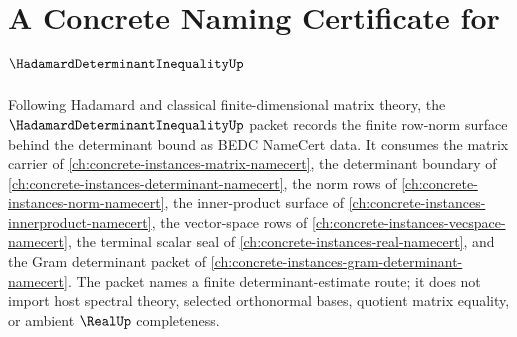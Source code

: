 \chapter{A Concrete Naming Certificate for $\HadamardDeterminantInequalityUp$}
\label{ch:concrete-instances-hadamard-determinant-inequality-namecert}

Following Hadamard and classical finite-dimensional matrix theory, the
$\HadamardDeterminantInequalityUp$ packet records the finite row-norm surface
behind the determinant bound as BEDC NameCert data. It consumes the matrix
carrier of \autoref{ch:concrete-instances-matrix-namecert}, the determinant
boundary of \autoref{ch:concrete-instances-determinant-namecert}, the norm
rows of \autoref{ch:concrete-instances-norm-namecert}, the inner-product
surface of \autoref{ch:concrete-instances-innerproduct-namecert}, the
vector-space rows of \autoref{ch:concrete-instances-vecspace-namecert}, the
terminal scalar seal of \autoref{ch:concrete-instances-real-namecert}, and the
Gram determinant packet of
\autoref{ch:concrete-instances-gram-determinant-namecert}. The packet names a
finite determinant-estimate route; it does not import host spectral theory,
selected orthonormal bases, quotient matrix equality, or ambient
$\RealUp$ completeness.

